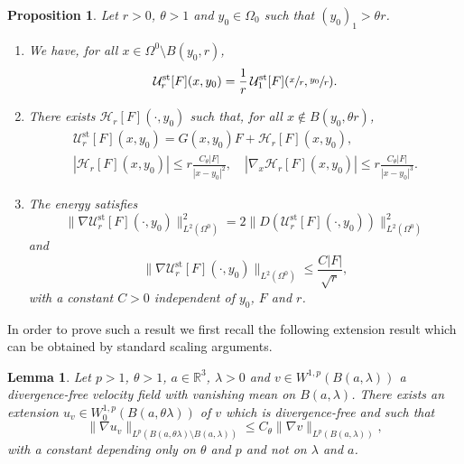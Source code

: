 \documentclass[JEP,XML,SOM,Unicode,NoEqCountersInSection,published]{cedram}
\newcommand{\st}{\mathrm{st}}
\theoremstyle{plain}
\newtheorem{prop}[thm]{Proposition}
\newtheorem{lemme}[thm]{Lemma}
\theoremstyle{definition}
\let\na\nabla
\newcommand{\R}{\mathbb{R}}
\begin{document}
\begin{prop}\label{prop:stokeslet}
Let $r>0$, $\theta>1$ and $y_0 \in \Omega_0$ such that $ (y_0)_1> \theta r$.
\begin{enumerate}
\item We have, for all $x \in \Omega^0 \setminus B(y_0,r)$,\label{ref:it1}
\[
\mathcal{U}^{\st}_{r}[F](x,y_0)= \frac{1}{r}\, \mathcal{U}^{\st}_{1}[F](\sfrac{x}{r},\sfrac{y_0}{r}).
\]

\item There exists $\mathcal{H}_r[F](\cdot,y_0)$ such that, for all $ x \not \in B(y_0,\theta r)$, \label{ref:it2}
\begin{gather}\label{eq:decomposition_stokeslet}
\mathcal{U}^{\st}_{r}[F](x,y_0)= G(x,y_0)F + \mathcal{H}_r[F](x,y_0),
\\
\label{eq:decay_rest_stokeslet}
\left|\mathcal{H}_r[F](x,y_0) \right|\leq r \frac{C_\theta|F| }{|x-y_0|^2}, \quad \left|\nabla_x \mathcal{H}_r[F](x,y_0) \right|\leq r \frac{C_\theta |F|}{|x-y_0|^3}.
\end{gather}
\item The energy satisfies \label{ref:it3}
\[
\|\nabla \mathcal{U}^{\st}_r[F](\cdot,y_0)\|_{L^2(\Omega^0)}^2=2\|D \left(\mathcal{U}^{\st}_r[F](\cdot,y_0) \right) \|_{L^2(\Omega^0)}^2
\]
and
\begin{equation}\label{eq:energy}
\|\nabla \mathcal{U}^{\st}_r[F](\cdot,y_0)\|_{L^2(\Omega^0)}\leq \frac{C|F|}{\sqrt{r}},
\end{equation}
with a constant $C>0$ independent of $y_0$, $F$ and $r$.
\end{enumerate}
\end{prop}
In order to prove such a result we first recall the following extension result which can be obtained by standard scaling arguments.
\begin{lemme}\label{lemme:extension}
Let $p>1$, $\theta>1$, $a \in \R^3$, $\lambda>0$ and $v \in W^{1,p}(B(a,\lambda))$ a divergence-free velocity field with vanishing mean on $B(a,\lambda)$. There exists an extension $u_v \in W^{1,p}_0(B(a,\theta \lambda))$
of $v$ which is divergence-free and such that
\[
\|\na u_v\|_{L^p(B(a,\theta \lambda) \setminus B(a,\lambda))} \leq C_\theta \|\nabla v\|_{L^p(B(a,\lambda))},
\]
with a constant depending only on $\theta$ and $p$ and not on $\lambda$ and $a$.
\end{lemme}
\end{document}
